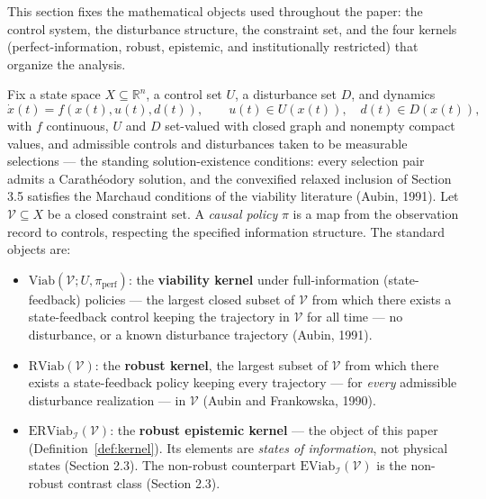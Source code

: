 \documentclass[10pt,twocolumn]{article}
\theoremstyle{definition}
\providecommand{\tightlist}{\setlength{\itemsep}{0pt}\setlength{\parskip}{0pt}}
\begin{document}
This section fixes the mathematical objects used throughout the paper:
the control system, the disturbance structure, the constraint set, and
the four kernels (perfect-information, robust, epistemic, and
institutionally restricted) that organize the analysis.

Fix a state space \(X \subseteq \mathbb{R}^n\), a control set \(U\), a
disturbance set \(D\), and dynamics
\[\dot x(t) = f(x(t), u(t), d(t)), \qquad u(t) \in U(x(t)), \quad d(t) \in D(x(t)),\]
with \(f\) continuous, \(U\) and \(D\) set-valued with closed graph and
nonempty compact values, and admissible controls and disturbances taken
to be measurable selections --- the standing solution-existence conditions:
every selection pair admits a Carath\'eodory solution, and the
convexified relaxed inclusion of Section 3.5 satisfies the Marchaud
conditions of the viability literature (Aubin, 1991). Let \(\mathcal{V} \subseteq X\) be a closed
constraint set. A \emph{causal policy} \(\pi\) is a map from the
observation record to controls, respecting the specified information structure. The standard objects are:

\begin{itemize}
\tightlist
\item
  \(\mathrm{Viab}(\mathcal{V}; U, \pi_{\mathrm{perf}})\): the
  \textbf{viability kernel} under full-information (state-feedback)
  policies --- the largest closed subset of \(\mathcal{V}\) from which
  there exists a state-feedback control keeping the trajectory in
  \(\mathcal{V}\) for all time --- no disturbance, or a known
  disturbance trajectory (Aubin, 1991).
\item
  \(\mathrm{RViab}(\mathcal{V})\): the \textbf{robust kernel}, the
  largest subset of \(\mathcal{V}\) from which there exists a
  state-feedback policy keeping every trajectory --- for \emph{every}
  admissible disturbance realization --- in \(\mathcal{V}\) (Aubin and
  Frankowska, 1990).
\item
  \(\mathrm{ERViab}_{\mathcal{I}}(\mathcal{V})\): the \textbf{robust
  epistemic kernel} --- the object of this paper (Definition~\ref{def:kernel}). Its
  elements are \emph{states of information}, not physical states
  (Section 2.3). The non-robust counterpart
  \(\mathrm{EViab}_{\mathcal{I}}(\mathcal{V})\) is the non-robust contrast class (Section 2.3).
\end{itemize}
\end{document}
